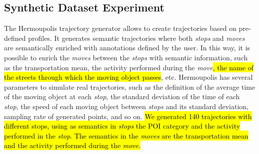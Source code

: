 \documentclass[12pt]{article}
\begin{document}


\subsection{Synthetic Dataset Experiment}\label{sec:hermoupolis}
The Hermoupolis trajectory generator \citep{Pelekis-Hermoupolis} allows to create trajectories based on pre-defined profiles. It generates semantic trajectories where both \emph{stops} and \emph{moves} are semantically enriched with annotations defined by the user. In this way, it is possible to enrich the \emph{moves} between the \emph{stops} with semantic information, such as the transportation mean, the activity performed during the \emph{move}\hl{, the name of the streets through which the moving object passes}, etc. Hermoupolis has several parameters to simulate real trajectories, such as the definition of the average time of the moving object at each \emph{stop}, the standard deviation of the time of each \emph{stop}, the speed of each moving object between \emph{stops} and its standard deviation, sampling rate of generated points, and so on. \hl{We generated 140 trajectories with different stops, using as semantics in \emph{stops} the POI category and the activity performed in the \emph{stop}. The semantics in the \emph{moves} are the transportation mean and the activity performed during the \emph{move}.}
\end{document}
